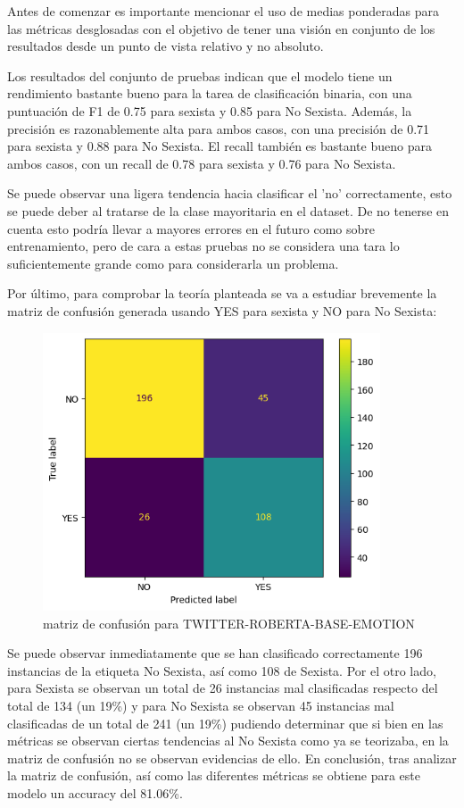 Antes de comenzar es importante mencionar el uso de medias ponderadas para las métricas desglosadas con el objetivo de tener una visión en conjunto de los resultados desde un punto de vista relativo y no absoluto.

Los resultados del conjunto de pruebas indican que el modelo tiene un rendimiento bastante bueno para la tarea de clasificación binaria, con una puntuación de F1 de 0.75 para sexista y 0.85 para No Sexista. Además, la precisión es razonablemente alta para ambos casos, con una precisión de 0.71 para sexista y 0.88 para No Sexista. El recall también es bastante bueno para ambos casos, con un recall de 0.78 para sexista y 0.76 para No Sexista.

Se puede observar una ligera tendencia hacia clasificar el 'no' correctamente, esto se puede deber al tratarse de la clase mayoritaria en el dataset. De no tenerse en cuenta esto podría llevar a mayores errores en el futuro como sobre entrenamiento, pero de cara a estas pruebas no se considera una tara lo suficientemente grande como para considerarla un problema.

Por último, para comprobar la teoría planteada se va a estudiar brevemente la matriz de confusión generada usando YES para sexista y NO para No Sexista:

\begin{figure}[H]
    \centering
    \includegraphics[width=10cm]{imagenes/Evaluacion/confusion_matrix/twitter_roberta_base_emotion-english-dirty.png}
    \caption{\centering matriz de confusión para TWITTER-ROBERTA-BASE-EMOTION}
\end{figure}


Se puede observar inmediatamente que se han clasificado correctamente 196 instancias de la etiqueta No Sexista, así como 108 de Sexista. Por el otro lado, para Sexista se observan un total de 26 instancias mal clasificadas respecto del total de 134 (un 19\%) y para No Sexista se observan 45 instancias mal clasificadas de un total de 241 (un 19\%) pudiendo determinar que si bien en las métricas se observan ciertas tendencias al No Sexista como ya se teorizaba, en la matriz de confusión no se observan evidencias de ello. En conclusión, tras analizar la matriz de confusión, así como las diferentes métricas se obtiene para este modelo un accuracy del 81.06\%.

